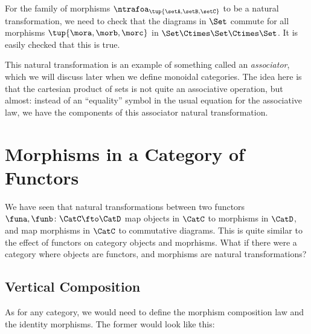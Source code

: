 \begin{example}
    For the family of morphisms $\ntrafoa_{\tup{\setA, \setB, \setC}}$ to be a natural transformation, we need to check that the diagrams
    in $\Set$ commute for all morphisms $\tup{\mora, \morb, \morc}$ in $\Set \Ctimes \Set \Ctimes \Set$.
    It is easily checked that this is true.

    This natural transformation is an example of something called an \emph{associator}, which we will discuss later when we define monoidal categories.
    The idea here is that the cartesian product of sets is not quite an associative operation, but almost: instead of an ``equality'' symbol in the usual equation for the associative law, we have the components of this associator natural transformation.
\end{example}




\section{Morphisms in a Category of Functors}
We have seen that natural transformations between two functors $\funa, \funb \colon \CatC \fto \CatD$ map objects in $\CatC$ to morphisms in $\CatD$, and map morphisms in $\CatC$ to commutative diagrams.
This is quite similar to the effect of functors on category objects and moprhisms.
What if there were a category where objects are functors, and morphisms are natural transformations?

\subsection{Vertical Composition}
As for any category, we would need to define the morphism composition law and the identity morphisms.
The former would look like this:


